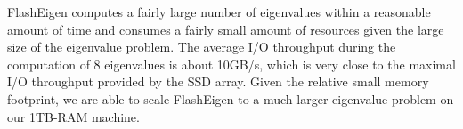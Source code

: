 FlashEigen computes a fairly large number of eigenvalues within a reasonable
amount of time and consumes a fairly small amount of resources given the large
size of the eigenvalue problem.
The average I/O throughput during the computation of 8 eigenvalues is about
10GB/s, which is very close to the maximal I/O throughput provided by
the SSD array.
Given the relative small memory footprint, we are able to scale FlashEigen
to a much larger eigenvalue problem on our 1TB-RAM machine.
